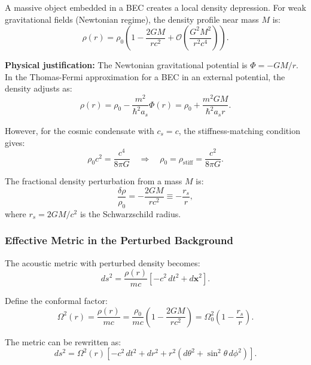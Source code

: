 \documentclass[11pt,a4paper]{article}
\newcommand{\rhostiff}{\ensuremath{\rho_{\mathrm{stiff}}}}
\newcommand{\cs}{\ensuremath{c_s}}
\theoremstyle{definition}
\theoremstyle{remark}
\begin{document}
A massive object embedded in a BEC creates a local density depression. For weak gravitational fields (Newtonian regime), the density profile near mass $M$ is:
\begin{equation}
\label{eq:density_perturbation}
\rho(r) = \rho_0 \left(1 - \frac{2GM}{rc^2} + \mathcal{O}\left(\frac{G^2M^2}{r^2c^4}\right) \right).
\end{equation}

\textbf{Physical justification:} The Newtonian gravitational potential is $\Phi = -GM/r$. In the Thomas-Fermi approximation for a BEC in an external potential, the density adjusts as:
\begin{equation}
\rho(r) = \rho_0 - \frac{m^2}{\hbar^2 a_s} \Phi(r) = \rho_0 + \frac{m^2 GM}{\hbar^2 a_s r}.
\end{equation}

However, for the cosmic condensate with $\cs = c$, the stiffness-matching condition gives:
\begin{equation}
\rho_0 c^2 = \frac{c^4}{8\pi G} \quad \Rightarrow \quad \rho_0 = \rhostiff = \frac{c^2}{8\pi G}.
\end{equation}

The fractional density perturbation from a mass $M$ is:
\begin{equation}
\frac{\delta\rho}{\rho_0} = -\frac{2GM}{rc^2} \equiv -\frac{r_s}{r},
\end{equation}
where $r_s = 2GM/c^2$ is the Schwarzschild radius.

\subsubsection{Effective Metric in the Perturbed Background}

The acoustic metric with perturbed density becomes:
\begin{equation}
\label{eq:perturbed_acoustic}
ds^2 = \frac{\rho(r)}{mc} \left[ -c^2 \, dt^2 + d\mathbf{x}^2 \right].
\end{equation}

Define the conformal factor:
\begin{equation}
\Omega^2(r) = \frac{\rho(r)}{mc} = \frac{\rho_0}{mc}\left(1 - \frac{2GM}{rc^2}\right) = \Omega_0^2 \left(1 - \frac{r_s}{r}\right).
\end{equation}

The metric can be rewritten as:
\begin{equation}
\label{eq:conformal_metric}
ds^2 = \Omega^2(r) \left[ -c^2 \, dt^2 + dr^2 + r^2(d\theta^2 + \sin^2\theta \, d\phi^2) \right].
\end{equation}
\end{document}
